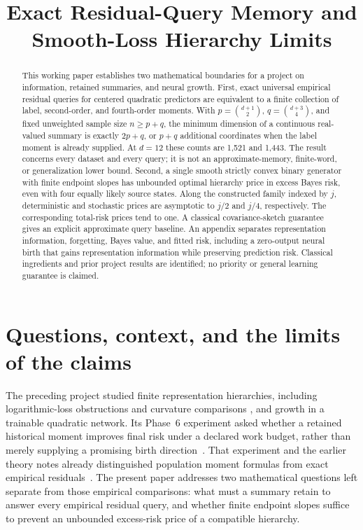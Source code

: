 \documentclass[11pt]{article}
\title{Exact Residual-Query Memory and\\Smooth-Loss Hierarchy Limits}
\theoremstyle{remark}
\begin{document}
\maketitle
\begin{abstract}
This working paper establishes two mathematical boundaries for a project
on information, retained summaries, and neural growth. First, exact
universal empirical residual queries for centered quadratic predictors
are equivalent to a finite collection of label, second-order, and
fourth-order moments. With $p=\binom{d+1}{2}$,
$q=\binom{d+3}{4}$, and fixed unweighted sample size $n\ge p+q$,
the minimum dimension of a continuous real-valued summary is exactly
$2p+q$, or $p+q$ additional coordinates when the label moment is
already supplied. At $d=12$ these counts are 1,521 and 1,443.
The result concerns every dataset and every query; it is not an
approximate-memory, finite-word, or generalization lower bound.
Second, a single smooth strictly convex binary generator with finite
endpoint slopes has unbounded optimal hierarchy price in excess
Bayes risk, even with four equally likely source states. Along the
constructed family indexed by $j$, deterministic and stochastic prices
are asymptotic to $j/2$ and $j/4$, respectively. The corresponding
total-risk prices tend to one.
A classical covariance-sketch guarantee gives an explicit approximate
query baseline. An appendix separates representation information,
forgetting, Bayes value, and fitted risk, including a zero-output
neural birth that gains representation information while preserving
prediction risk. Classical ingredients and prior project results
are identified; no priority or general learning guarantee is claimed.
\end{abstract}

\section{Questions, context, and the limits of the claims}
\label{sec:introduction}

The preceding project studied finite representation hierarchies,
including logarithmic-loss obstructions and curvature comparisons
\cite{finiteproject}, and growth in a trainable quadratic network.
Its Phase~6 experiment asked
whether a retained historical moment improves final risk under a
declared work budget, rather than merely supplying a promising birth
direction~\cite{phase6}. That experiment and the earlier theory notes
already distinguished population moment formulas from exact empirical
residuals~\cite{phase5,phase6}. The present paper addresses two
mathematical questions left separate from those empirical comparisons:
what must a summary retain to answer every empirical residual query,
and whether finite endpoint slopes suffice to prevent an unbounded
excess-risk price of a compatible hierarchy.
\end{document}

